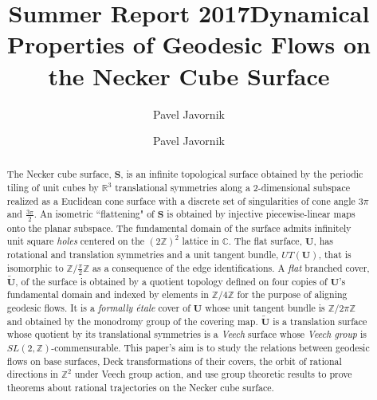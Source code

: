 \documentclass[]{article}
\begin{document}
\newtheorem{thm}{Theorem}[]
\newtheorem{Def}{Definition}[]
\newtheorem*{thm*}{Theorem}
\newtheorem*{def*}{Definition}
\newtheorem{lem}{Lemma}
\newtheorem*{rem}{Remark}
\newcommand{\shiftleft}[2]{\makebox[0pt][r]{\makebox[#1][l]{#2}}}
\newtheorem*{conj}{Conjecture}
\newtheorem{cor}{Corollary}[]

\newcommand{\compav}[1]{\textbf{\textcolor{blue}{#1}}}
\newcommand{\compat}[1]{\textbf{\textcolor{red}{#1}}}
\graphicspath{{images/}}

\title{Summer Report 2017}
\author{Pavel Javornik}


\title{Dynamical Properties of Geodesic Flows on the Necker Cube Surface}
\author{Pavel Javornik}




\maketitle

\begin{figure}[H]
\centering

\end{figure}

%

\begin{abstract}
The Necker cube surface, $\mathbf{S}$, is an infinite topological surface obtained by the periodic tiling of unit cubes by $\mathbb{R}^3$ translational symmetries along a 2-dimensional subspace realized as a Euclidean cone surface with a discrete set of singularities of cone angle $3\pi$ and $\frac{3\pi}{2}$. An isometric ``flattening" of $\mathbf{S}$ is obtained by injective piecewise-linear maps onto the planar subspace. The fundamental domain of the surface admits infinitely unit square \emph{holes} centered on the  $(2\mathbb{Z})^2$ lattice in $\mathbb{C}$. The flat surface, $\mathbf{U}$, has rotational and translation symmetries and a unit tangent bundle, $UT(\mathbf{U})$, that is isomorphic to $\mathbb{Z}/\frac{\pi}{2}\mathbb{Z}$ as a consequence of the edge identifications. A \emph{flat} branched cover, $\tilde{\mathbf{U}}$, of the surface is obtained by a quotient topology defined on four copies of $\mathbf{U}$'s fundamental domain and indexed by elements in $\mathbb{Z}/4\mathbb{Z}$ for the purpose of aligning geodesic flows. It is a \emph{formally étale} cover of $\mathbf{U}$ whose unit tangent bundle is $\mathbb{Z}/2\pi\mathbb{Z}$ and obtained by the monodromy group of the covering map. $\tilde{\mathbf{U}}$ is a translation surface whose quotient by its translational symmetries is a \emph{Veech} surface whose \emph{Veech group} is $SL(2,\mathbb{Z})$-commensurable. This paper's aim is to study the relations between geodesic flows on base surfaces, Deck transformations of their covers, the orbit of rational directions in $\mathbb{Z}^2$ under Veech group action, and use group theoretic results to prove theorems about rational trajectories on the Necker cube surface.
\end{abstract}
\end{document}
